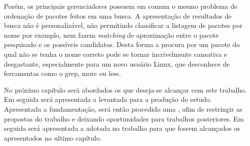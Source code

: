 Porém, os principais gerenciadores possuem em comum o mesmo problema de ordenação de pacotes feitos em uma busca. A apresentação de resultados de busca não é personalizável, não permitindo classificar a listagem de pacotes por nome por exemplo, nem fazem \textit{matching} de aproximação  entre o pacote pesquisado e os possíveis candidatos. Desta forma a procura por um pacote do qual não se tenha o nome correto pode se tornar incrivelmente cansativa e desgastante, especialmente para um novo usuário Linux, que desconhece de ferramentas como o {\code grep, more} ou {\code  less}. 


No próximo capítulo será abordados os  que deseja-se alcançar com este trabalho. Em seguida será apresentada a  levantada para a produção do estudo. Apresentada a fundamentação, será então procedido uma , afim de restringir as propostas do trabalho e deixando oportunidades para trabalhos posteriores. Em seguida será apresentada a  adotada no trabalho para que fossem alcançados os  apresentados no ultimo capítulo.